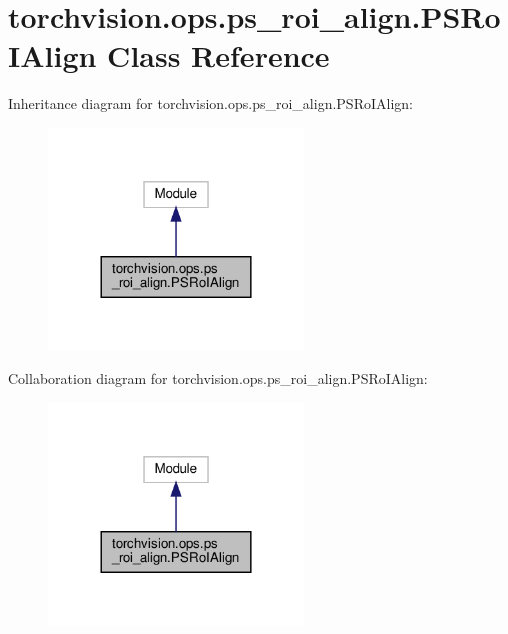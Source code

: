 \hypertarget{classtorchvision_1_1ops_1_1ps__roi__align_1_1PSRoIAlign}{}\section{torchvision.\+ops.\+ps\+\_\+roi\+\_\+align.\+P\+S\+Ro\+I\+Align Class Reference}
\label{classtorchvision_1_1ops_1_1ps__roi__align_1_1PSRoIAlign}


Inheritance diagram for torchvision.\+ops.\+ps\+\_\+roi\+\_\+align.\+P\+S\+Ro\+I\+Align\+:
\nopagebreak
\begin{figure}[H]
\begin{center}
\leavevmode
\includegraphics[width=192pt]{classtorchvision_1_1ops_1_1ps__roi__align_1_1PSRoIAlign__inherit__graph}
\end{center}
\end{figure}


Collaboration diagram for torchvision.\+ops.\+ps\+\_\+roi\+\_\+align.\+P\+S\+Ro\+I\+Align\+:
\nopagebreak
\begin{figure}[H]
\begin{center}
\leavevmode
\includegraphics[width=192pt]{classtorchvision_1_1ops_1_1ps__roi__align_1_1PSRoIAlign__coll__graph}
\end{center}
\end{figure}
